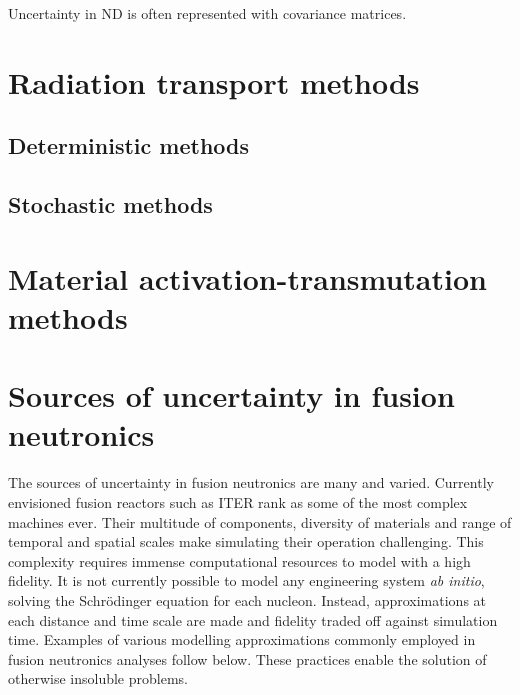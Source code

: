 Uncertainty in ND is often represented with covariance matrices.


\section{Radiation transport methods}
\subsection{Deterministic methods}
\subsection{Stochastic methods}

\section{Material activation-transmutation methods}

\section{Sources of uncertainty in fusion neutronics}
The sources of uncertainty in fusion neutronics are many and varied. Currently envisioned fusion reactors such as ITER rank as some of the most complex machines ever. Their multitude of components, diversity of materials and range of temporal and spatial scales make simulating their operation challenging. This complexity requires immense computational resources to model with a high fidelity. It is not currently possible to model any engineering system \textit{ab initio}, solving the Schr{\"o}dinger equation for each nucleon. Instead, approximations at each distance and time scale are made and fidelity traded off against simulation time. Examples of various modelling approximations commonly employed in fusion neutronics analyses follow below. These practices enable the solution of otherwise insoluble problems.  

